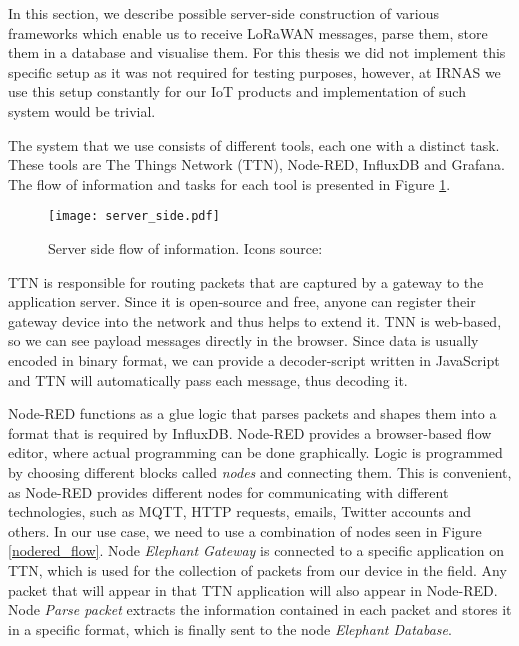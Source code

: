In this section, we describe possible server-side construction of various frameworks which enable us to receive LoRaWAN messages, parse them, store them in a database and visualise them.
For this thesis we did not implement this specific setup as it was not required for testing purposes, however, at IRNAS we use this setup constantly for our IoT products and implementation of such system would be trivial.

The system that we use consists of different tools, each one with a distinct task.
These tools are The Things Network (TTN), Node-RED, InfluxDB and Grafana.
The flow of information and tasks for each tool is presented in Figure \ref{server_side}.

\begin{figure}[ht]
    \centering
    \texttt{[image: server\_side.pdf]} 
    \caption[Server side flow of information.]{Server side flow of information. Icons source:\cite{icons}}
    \label{server_side}
\end{figure}

TTN is responsible for routing packets that are captured by a gateway to the application server.
Since it is open-source and free, anyone can register their gateway device into the network and thus helps to extend it.
TNN is web-based, so we can see payload messages directly in the browser.
Since data is usually encoded in binary format, we can provide a decoder-script written in JavaScript and TTN will automatically pass each message, thus decoding it.

Node-RED functions as a glue logic that parses packets and shapes them into a format that is required by InfluxDB.
Node-RED provides a browser-based flow editor, where actual programming can be done graphically.
Logic is programmed by choosing different blocks called \textit{nodes} and connecting them.
This is convenient, as Node-RED provides different nodes for communicating with different technologies, such as MQTT, HTTP requests, emails, Twitter accounts and others.
In our use case, we need to use a combination of nodes seen in Figure \ref{nodered_flow}.
Node \textit{Elephant Gateway} is connected to a specific application on TTN, which is used for the collection of packets from our device in the field.
Any packet that will appear in that TTN application will also appear in Node-RED.
Node \textit{Parse packet} extracts the information contained in each packet and stores it in a specific format, which is finally sent to the node \textit{Elephant Database}.

